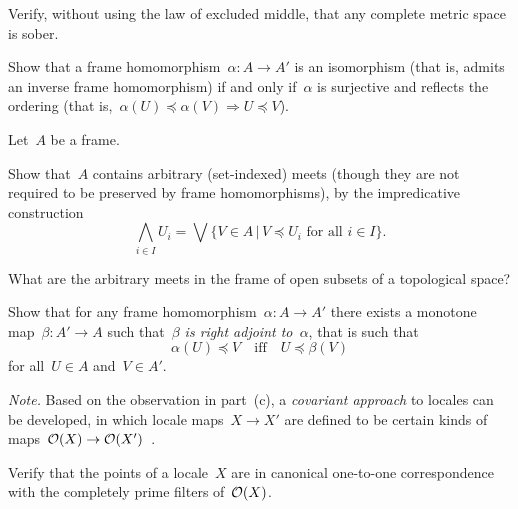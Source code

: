 \documentclass{ws-rv9x6}
\begin{document}
{\begin{exercise}
Verify, without using the law of excluded middle, that any complete metric
space is sober. \smallskip

\end{exercise}

\begin{exercise}%
\label{ex:isomorphisms-of-frames}%
Show that a frame homomorphism~$\alpha : A \to A'$ is an isomorphism (that is,
admits an inverse frame homomorphism) if and only if~$\alpha$ is surjective and
reflects the ordering (that is,~$\alpha(U) \preceq \alpha(V) \Rightarrow U
\preceq V$).
\end{exercise}

\begin{exercise}%
Let~$A$ be a frame.
\begin{alphlist}[(c)]
\item Show that~$A$ contains arbitrary (set-indexed) meets (though they are not
required to be preserved by frame homomorphisms), by the impredicative
construction
\[ \bigwedge_{i \in I} U_i = \bigvee\{ V \in A \,|\, \text{$V \preceq U_i$ for all~$i \in I$}
\}. \]
\item What are the arbitrary meets in the frame of open subsets of a
topological space?
\item Show that for any frame homomorphism~$\alpha : A \to A'$ there exists a
monotone map~$\beta : A' \to A$ such that~\emph{$\beta$ is right adjoint
to~$\alpha$}, that is such that
\[ \alpha(U) \preceq V \quad\text{iff}\quad U \preceq \beta(V) \]
for all~$U \in A$ and~$V \in A'$.
\end{alphlist}
{\scriptsize\emph{Note.} Based on the observation in part~(c), a
\emph{covariant approach} to locales can be developed, in which locale maps~$X
\to X'$ are defined to be certain kinds of maps~$\mathcal{O}(X) \to
\mathcal{O}(X')$~\cite{picado-pultr:covariant}.\par}
\end{exercise}

\begin{exercise}%
\label{ex:points-as-filters}%
Verify that the points of a locale~$X$ are in canonical one-to-one correspondence
with the completely prime filters of~$\mathcal{O}(X)$.
\end{exercise}

}
\end{document}
